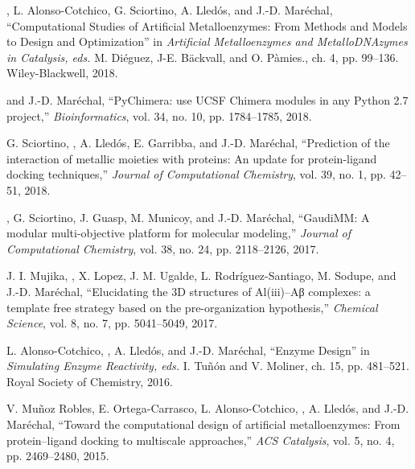 \begin{etaremune}
\item {}, L. Alonso-Cotchico, G. Sciortino, A. Lledós, and J.-D. Maréchal, ``Computational Studies of Artificial Metalloenzymes: From Methods and Models to Design and Optimization'' in {\em Artificial Metalloenzymes and MetalloDNAzymes in Catalysis, eds.} M. Diéguez, J-E. Bäckvall, and O. Pàmies., ch. 4, pp. 99--136. Wiley-Blackwell, 2018.

\item {} and J.-D. Mar{\'e}chal, ``{PyChimera}: use {UCSF Chimera} modules in any {Python 2.7} project,'' {\em Bioinformatics}, vol. 34, no. 10, pp. 1784--1785, 2018.

\item G. Sciortino, , A. Lled{\'o}s, E. Garribba, and J.-D. Mar{\'e}chal, ``Prediction of the interaction of metallic moieties with proteins: An update for protein-ligand docking techniques,'' {\em Journal of Computational Chemistry}, vol. 39, no. 1, pp. 42--51, 2018.
  
\item {}, G. Sciortino, J. Guasp, M. Municoy, and J.-D. Mar{\'e}chal, ``{GaudiMM}: A modular multi-objective platform for molecular modeling,'' {\em Journal of Computational Chemistry}, vol. 38, no. 24, pp. 2118--2126, 2017.

\item J. I. Mujika, , X. Lopez, J. M. Ugalde, L. Rodríguez-Santiago, M. Sodupe, and J.-D. Mar{\'e}chal, ``Elucidating the {3D} structures of {Al(iii)--Aβ complexes}: a template free strategy based on the pre-organization hypothesis,'' {\em Chemical Science}, vol. 8, no. 7, pp. 5041--5049, 2017.

\item L. Alonso-Cotchico, , A. Lled{\'o}s, and J.-D. Mar{\'e}chal, ``Enzyme Design'' in {\em Simulating Enzyme Reactivity, eds.} I. Tuñón and V. Moliner, ch. 15, pp. 481--521. Royal Society of Chemistry, 2016.
  
\item V. Muñoz Robles, E. Ortega-Carrasco, L. Alonso-Cotchico, , A. Lledós, and J.-D. Maréchal, ``Toward the computational design of artificial metalloenzymes: From protein--ligand docking to multiscale approaches,'' {\em ACS Catalysis}, vol. 5, no. 4, pp. 2469--2480, 2015.

\end{etaremune}


